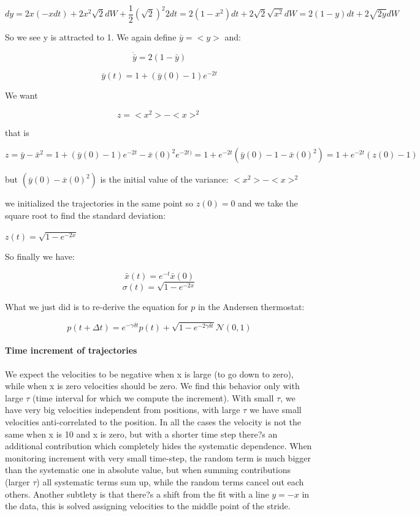 \documentclass[a4paper, italian, openany]{book}
\begin{document}
$$dy = 2x(-xdt)+2x^2\sqrt{2}dW+\frac{1}{2} (\sqrt{2})^2 2dt = 2(1-x^2)dt+2\sqrt{2}\sqrt{x^2}dW=2(1-y)dt+2\sqrt{2y}dW$$

So we see y is attracted to 1. We again define $\bar{y}=<y>$ and:

$$\dot{\bar{y}}=2(1-\bar{y})$$

$$\bar{y}(t) = 1+ (\bar{y}(0)-1)e^{-2t}$$

We want

$$z=<x^2> - <x>^2$$

that is

$$z = \bar{y} - \bar{x}^2 = 1+(\bar{y}(0)-1)e^{-2t} - \bar{x}(0)^2e^{-2t)}=1 + e^{-2t}(\bar{y}(0)-1-\bar{x}(0)^2)=1+e^{-2t}(z(0)-1)$$

but $(\bar{y}(0) - \bar{x}(0)^2)$ is the initial value of the variance: $<x^2> - <x>^2$

we initialized the trajectories in the same point so $z(0)=0$ and we take the square root to find the standard deviation:

$z(t)=\sqrt{1-e^{-2x}}$

So finally we have:

$$\bar{x}(t) = e^{-t} \bar{x}(0)$$
$$\sigma(t)=\sqrt{1-e^{-2x}}$$

What we just did is to re-derive the equation for $p$ in the Andersen thermostat:

$$p(t+\Delta t)= e^{-\gamma\delta t}p(t)+\sqrt{1-e^{-2\gamma\delta t}}\mathcal{N}(0, 1)$$

\paragraph{Time increment of trajectories}

We expect the velocities to be negative when x is large (to go down to zero), while when x is zero velocities should be zero. We find this behavior only with large $\tau$ (time interval for which we compute the increment).\newline
With small $\tau$, we have very big velocities independent from positions, with large $\tau$ we have small velocities anti-correlated to the position.\newline
In all the cases the velocity is not the same when x is 10 and x is zero, but with a shorter time step there?s an additional contribution which completely hides the systematic dependence.\newline
When monitoring increment with very small time-step, the random term is much bigger than the systematic one in absolute value, but when summing contributions (larger $\tau$) all systematic terms sum up, while the random terms cancel out each others.\newline
Another subtlety is that there?s a shift from the fit with a line $y=-x$ in the data, this is solved assigning velocities to the middle point of the stride.
\end{document}
